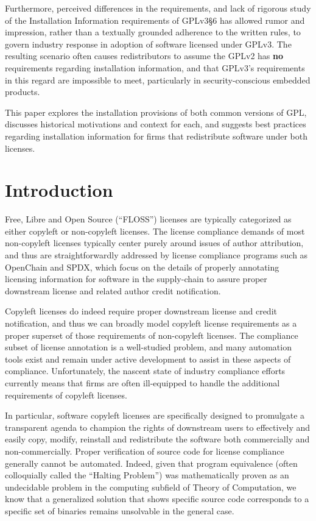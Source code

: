 Furthermore, perceived differences in the requirements, and lack of rigorous
study of the Installation Information requirements of GPLv3\S6 has allowed
rumor and impression, rather than a textually grounded adherence to the
written rules, to govern industry response in adoption of software licensed
under GPLv3.  The resulting scenario often causes redistributors to assume
the GPLv2 has \textbf{no} requirements regarding installation information,
and that GPLv3's requirements in this regard are impossible to meet,
particularly in security-conscious embedded products.

This paper explores the installation provisions of both common versions of
GPL, discusses historical motivations and context for each, and suggests best
practices regarding installation information for firms that redistribute
software under both licenses.

\section{Introduction}

Free, Libre and Open Source (``FLOSS'') licenses are typically categorized as
either copyleft or non-copyleft licenses.  The license compliance demands of
most non-copyleft licenses typically center purely around issues of author
attribution, and thus are straightforwardly addressed by license compliance
programs such as OpenChain and SPDX, which focus on the details of properly
annotating licensing information for software in the supply-chain to assure
proper downstream license and related author credit notification.

Copyleft licenses do indeed require proper downstream license and credit
notification, and thus we can broadly model copyleft license requirements as
a proper superset of those requirements of non-copyleft licenses.  The
compliance subset of license annotation is a well-studied problem, and many
automation tools exist and remain under active development to assist in these
aspects of compliance. Unfortunately, the nascent state of industry
compliance efforts currently means that firms are often ill-equipped to
handle the additional requirements of copyleft licenses.

In particular, software copyleft licenses are specifically designed to
promulgate a transparent agenda to champion the rights of downstream users to
effectively and easily copy, modify, reinstall and redistribute the software
both commercially and non-commercially.  Proper verification of source code
for license compliance generally cannot be automated.  Indeed, given that
program equivalence (often colloquially called the ``Halting Problem'') was
mathematically proven as an undecidable problem in the computing subfield of
Theory of Computation, we know that a generalized solution that shows
specific source code corresponds to a specific set of binaries remains
unsolvable in the general case.

